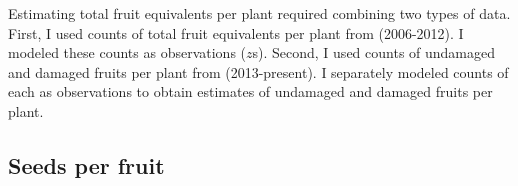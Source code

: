 \documentclass[12pt, oneside, titlepage]{article}   	%
\begin{document}
Estimating total fruit equivalents per plant required combining two types of data. First, I used counts of total fruit equivalents per plant from (2006-2012). I modeled these counts as observations ($z$s). Second, I used counts of undamaged and damaged fruits per plant from (2013-present). I separately modeled counts of each as observations to obtain estimates of undamaged and damaged fruits per plant. 



\subsection{Seeds per fruit}

\end{document}
